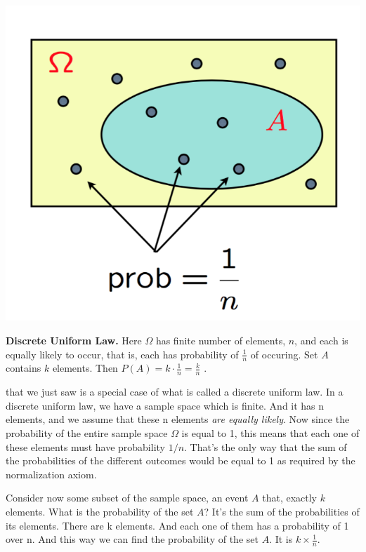 \documentclass{tufte-handout}
\begin{document}
\vspace{0.3cm}
\begin{marginfigure}
  \includegraphics{DiscreteUniform}
  \caption{\textbf{Discrete Uniform Law.} Here $\Omega$ has finite number of elements, $n$, and each is equally likely to occur, 
  that is, each has probability of $\frac{1} {n}$ of occuring. Set $A$ contains $k$ elements. Then $P(A) = k \cdot \frac{1} {n} = \frac{k} {n} $ .}
\end{marginfigure}

 that we just saw is a special case of what is called a discrete uniform law. In a
discrete uniform law, we have a sample space which is finite. And it has n elements, and we assume
that these n elements \textit{are equally likely}. Now since the probability of the entire
sample space $\Omega$ is equal to 1, this means that each one of these elements must have probability $1/n$. That's the only way that the sum of the probabilities of the different outcomes would be equal to 1 as
required by the normalization axiom.


Consider now some subset of the sample space, an event $A$ that, exactly $k$ elements. What is the
probability of the set $A$? It's the sum of the probabilities of its elements. There are k elements. And each
one of them has a probability of 1 over n. And this way we can find the probability of the set $A$. It is $k \times \frac{1}{n}$.
\end{document}
